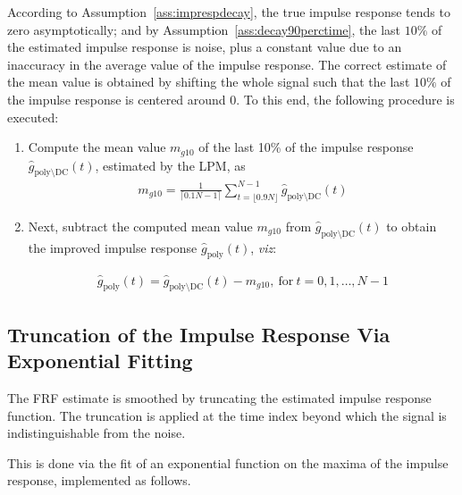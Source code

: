 According to Assumption~\ref{ass:imprespdecay}, the true impulse response tends to zero asymptotically; and by Assumption~\ref{ass:decay90perctime}, the last $10\%$ of the estimated impulse response is noise, plus a constant value due to an inaccuracy in the average value of the impulse response. The correct estimate of the mean value is obtained by shifting the whole signal such that the last $10\%$ of the impulse response is centered around 0.
To this end, the following procedure is executed:


\begin{enumerate}
\item Compute the mean value $m_{g10}$ of the last 10\% of the impulse response $\hat g_{\mathrm{poly}\setminus \mathrm{DC
}}(t)$, estimated by the \gls{LPM}, as %
\begin{align}
m_{g10} = \frac{1}{\lceil0.1N - 1\rceil}\sum_{t=\lfloor0.9N\rfloor}^{N-1}\hat g_{\mathrm{poly}\setminus \mathrm{DC
}}(t)
\end{align}

\item Next, subtract the computed mean value $m_{g10}$ from $\hat g_{\mathrm{poly}\setminus \mathrm{DC
}}(t)$ to obtain the improved impulse response $\hat g_\mathrm{poly}(t)$, \emph{viz}:


\begin{align}
\hat g_\mathrm{poly}(t) = \hat g_{\mathrm{poly}\setminus \mathrm{DC
}}(t) - m_{g10},\ \text{for}\ t=0,1,\dots,N-1
\end{align}


\end{enumerate}

\subsection{Truncation of the Impulse Response Via Exponential Fitting}\label{se:truncImpulseResp}

The \gls{FRF} estimate is smoothed by truncating the estimated impulse response function. 
The truncation is applied at the time index beyond which the signal is indistinguishable from the noise.

This is done via the fit of an exponential function on the maxima of the impulse response, implemented as follows.

